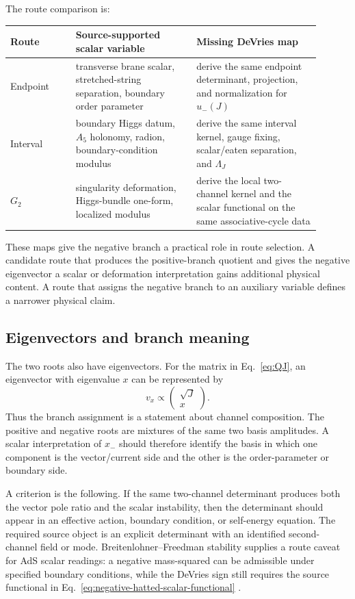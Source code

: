 The route comparison is:
\begin{center}
\small
\begin{tabular}{p{0.19\linewidth}p{0.35\linewidth}p{0.36\linewidth}}
\toprule
Route & Source-supported scalar variable & Missing DeVries map\\
\midrule
Endpoint & transverse brane scalar, stretched-string separation, boundary order parameter & derive the same endpoint determinant, projection, and normalization for \(u_-(J)\)\\
Interval & boundary Higgs datum, \(A_5\) holonomy, radion, boundary-condition modulus & derive the same interval kernel, gauge fixing, scalar/eaten separation, and \(\Lambda_J\)\\
\(G_2\) & singularity deformation, Higgs-bundle one-form, localized modulus & derive the local two-channel kernel and the scalar functional on the same associative-cycle data\\
\bottomrule
\end{tabular}
\end{center}

These maps give the negative branch a practical role in route selection.  A candidate route that produces the positive-branch quotient and gives the negative eigenvector a scalar or deformation interpretation gains additional physical content.  A route that assigns the negative branch to an auxiliary variable defines a narrower physical claim.

\subsection{Eigenvectors and branch meaning}

The two roots also have eigenvectors.  For the matrix in Eq.~\eqref{eq:QJ}, an eigenvector with eigenvalue \(x\) can be represented by
\begin{equation}
  v_x \propto
  \begin{pmatrix}
  \sqrt J\\
  x
  \end{pmatrix}.
  \label{eq:branch-eigenvector}
\end{equation}
Thus the branch assignment is a statement about channel composition.  The positive and negative roots are mixtures of the same two basis amplitudes.  A scalar interpretation of \(x_-\) should therefore identify the basis in which one component is the vector/current side and the other is the order-parameter or boundary side.

A criterion is the following.  If the same two-channel determinant produces both the vector pole ratio and the scalar instability, then the determinant should appear in an effective action, boundary condition, or self-energy equation.  The required source object is an explicit determinant with an identified second-channel field or mode.  Breitenlohner--Freedman stability supplies a route caveat for AdS scalar readings: a negative mass-squared can be admissible under specified boundary conditions, while the DeVries sign still requires the source functional in Eq.~\eqref{eq:negative-hatted-scalar-functional} \cite{BreitenlohnerFreedman1982}.
